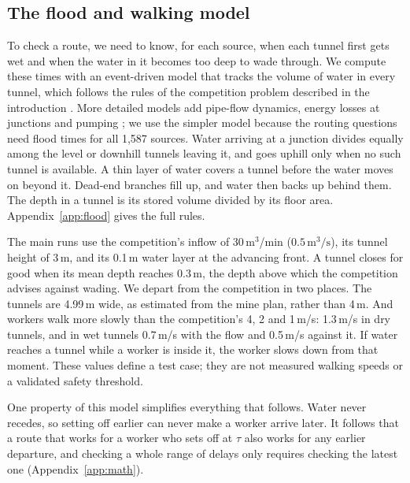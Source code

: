 \subsection{The flood and walking model}\label{sec:hazard}
To check a route, we need to know, for each source, when each tunnel first gets wet and when the water in it becomes too deep to wade through. We compute these times with an event-driven model that tracks the volume of water in every tunnel, which follows the rules of the competition problem described in the introduction \cite{cumcm}. More detailed models add pipe-flow dynamics, energy losses at junctions and pumping \cite{zhang2022}; we use the simpler model because the routing questions need flood times for all 1,587 sources. Water arriving at a junction divides equally among the level or downhill tunnels leaving it, and goes uphill only when no such tunnel is available. A thin layer of water covers a tunnel before the water moves on beyond it. Dead-end branches fill up, and water then backs up behind them. The depth in a tunnel is its stored volume divided by its floor area. Appendix~\ref{app:flood} gives the full rules.

The main runs use the competition's inflow of 30\,m$^3$/min ($0.5\,\mathrm{m^3/s}$), its tunnel height of 3\,m, and its 0.1\,m water layer at the advancing front. A tunnel closes for good when its mean depth reaches 0.3\,m, the depth above which the competition advises against wading. We depart from the competition in two places. The tunnels are 4.99\,m wide, as estimated from the mine plan, rather than 4\,m. And workers walk more slowly than the competition's 4, 2 and 1\,m/s: 1.3\,m/s in dry tunnels, and in wet tunnels 0.7\,m/s with the flow and 0.5\,m/s against it. If water reaches a tunnel while a worker is inside it, the worker slows down from that moment. These values define a test case; they are not measured walking speeds or a validated safety threshold.

One property of this model simplifies everything that follows. Water never recedes, so setting off earlier can never make a worker arrive later. It follows that a route that works for a worker who sets off at $\tau$ also works for any earlier departure, and checking a whole range of delays only requires checking the latest one (Appendix~\ref{app:math}).

